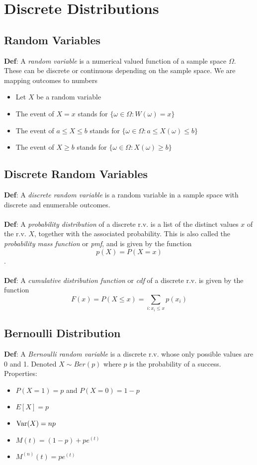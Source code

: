 \documentclass{article}
\newcommand{\var}{\textup{Var}}
\begin{document}
\pagebreak

\section{Discrete Distributions}

\subsection{Random Variables}

\textbf{Def}: A \emph{random variable} is a numerical valued function of a sample space $\Omega$. These can be discrete or continuous depending on the sample space. We are mapping outcomes to numbers
\begin{itemize}
\item Let $X$ be a random variable
\item The event of $X=x$ stands for $\{\omega\in\Omega : W(\omega)=x\}$
\item The event of $a\leq X \leq b$ stands for $\{\omega\in\Omega : a\leq X(\omega)\leq b\}$
\item The event of $X\geq b$ stands for  $\{\omega\in\Omega : X(\omega) \geq b\}$
\end{itemize}

\subsection{Discrete Random Variables}

\textbf{Def}: A \emph{discrete random variable} is a random variable in a sample space with discrete and enumerable outcomes.
\\\\
\textbf{Def}: A \emph{probability distribution} of a discrete r.v. is a list of the distinct values $x$ of the r.v. $X$, together with the associated probability. This is also called the \emph{probability mass function} or \emph{pmf}, and is given by the function $$p(X)=P(X=x)$$.
\\\\
\textbf{Def}: A \emph{cumulative distribution function} or \emph{cdf} of a discrete r.v. is given by the function
$$F(x)=P(X\leq x)=\sum_{i:x_i\leq x}p(x_i)$$

\subsection{Bernoulli Distribution}

\textbf{Def}: A \emph{Bernoulli random variable} is a discrete r.v. whose only possible values are 0 and 1. Denoted $X\sim Ber(p)$ where $p$ is the probability of a success. Properties:
\begin{itemize}
\item $P(X=1)=p$ and $P(X=0)=1-p$
\item $E[X]=p$
\item $\var(X)=np$
\item $M(t)=(1-p)+pe^(t)$
\item $M^{(n)}(t)=pe^(t)$
\end{itemize}
\end{document}
